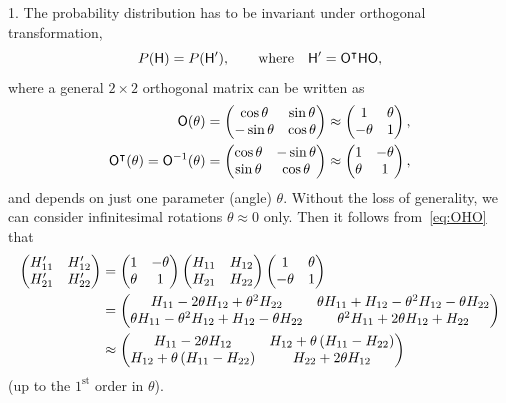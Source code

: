 \documentclass[a4paper,11pt,twoside]{article}
\begin{document}
            1. The probability distribution has to be invariant under orthogonal transformation,
            \begin{equation}\label{eq:OHO}
                P(\mathsf{H})=P(\mathsf{H}'),\qquad\text{where}\quad\mathsf{H}'={\mathsf{O}}^{\intercal}\mathsf{H}\mathsf{O},
            \end{equation}
            where a general $2\times2$ orthogonal matrix can be written as
            \begin{align}\label{eq:O}
                \mathsf{O}(\theta)
                    &=\begin{pmatrix}\cos\theta & \sin\theta \\ -\sin\theta & \cos\theta\end{pmatrix}
                    \approx\begin{pmatrix}1 & \theta \\ -\theta & 1\end{pmatrix},\\
                    {\mathsf{O}}^{\intercal}(\theta)
                    =\mathsf{O}^{-1}(\theta)
                    &=\begin{pmatrix}\cos\theta & -\sin\theta \\ \sin\theta & \cos\theta\end{pmatrix}
                    \approx\begin{pmatrix}1 & -\theta \\ \theta & 1\end{pmatrix},
            \end{align}
            and depends on just one parameter (angle) $\theta$.
            Without the loss of generality, we can consider infinitesimal rotations $\theta\approx0$ only.
            Then it follows from~\eqref{eq:OHO} that
            \begin{align}
                \begin{pmatrix}H'_{11} & H'_{12} \\ H'_{21} & H'_{22}\end{pmatrix}
                    &=\begin{pmatrix}1 & -\theta \\ \theta & 1\end{pmatrix}
                        \begin{pmatrix}H_{11} & H_{12} \\ H_{21} & H_{22}\end{pmatrix}
                        \begin{pmatrix}1 & \theta \\ -\theta & 1\end{pmatrix}\nonumber\\
                    &=\begin{pmatrix}H_{11}-2\theta H_{12}+\theta^{2}H_{22} & 
                        \theta H_{11}+H_{12}-\theta^{2}H_{12}-\theta H_{22} \\
                        \theta H_{11}-\theta^{2}H_{12}+H_{12}-\theta H_{22} & 
                        \theta^{2}H_{11}+2\theta H_{12}+H_{22}\end{pmatrix}\nonumber\\
                    \label{eq:HpH}
                    &\approx\begin{pmatrix}H_{11}-2\theta H_{12} & H_{12}+\theta\left(H_{11}-H_{22}\right) \\
                        H_{12}+\theta\left(H_{11}-H_{22}\right) & H_{22}+2\theta H_{12}\end{pmatrix}
            \end{align}
            (up to the $1^{\text{st}}$ order in $\theta$).
\end{document}
